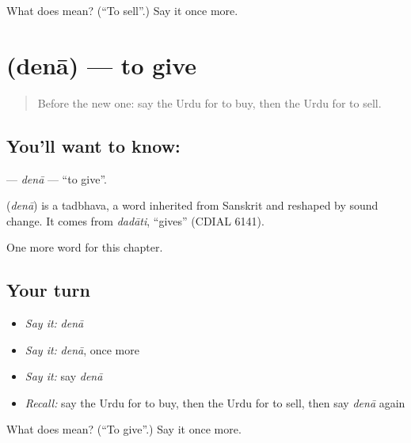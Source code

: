 \begin{tcolorbox}[breakable,colback=teal!4,colframe=teal!35!black,title={Before you move on}]
What does  mean? (\textquotedblleft{}To sell\textquotedblright{}.) Say it once more.
\end{tcolorbox}
\section[\texorpdfstring{\ur{دینا} (denā)}{دینا (denā)}]{ (denā) — to give}

\label{lesson:UR-C48-dena}



\begin{quote}
Before the new one: say the Urdu for to buy, then the Urdu for to sell.
\end{quote}

\subsection*{You'll want to know: }
\textbf{} — \emph{denā} — \textquotedblleft{}to give\textquotedblright{}.

\begin{cousinweb}
\textbf{} (\emph{denā}) is a tadbhava, a word inherited from Sanskrit and reshaped by sound change. It comes from \emph{dadāti}, \textquotedblleft{}gives\textquotedblright{} (CDIAL 6141).
\end{cousinweb}

\begin{grammarlens}[title={What you've built}]
One more word for this chapter.
\end{grammarlens}

\subsection*{Your turn}
\begin{itemize}
\raggedright
  \item \emph{Say it:} \emph{denā}
  \item \emph{Say it:} \emph{denā}, once more
  \item \emph{Say it:} say \emph{denā}
  \item \emph{Recall:} say the Urdu for to buy, then the Urdu for to sell, then say \emph{denā} again
\end{itemize}

\begin{tcolorbox}[breakable,colback=teal!4,colframe=teal!35!black,title={Before you move on}]
What does  mean? (\textquotedblleft{}To give\textquotedblright{}.) Say it once more.
\end{tcolorbox}
